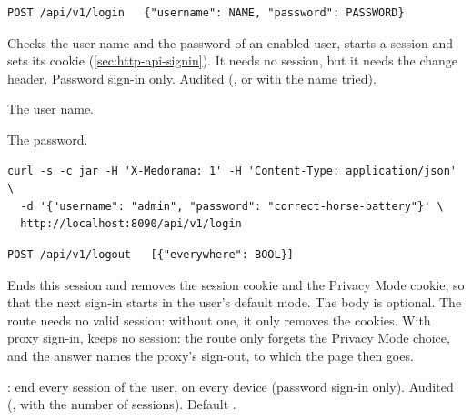 \begin{lstlisting}[style=signature]
POST /api/v1/login   {"username": NAME, "password": PASSWORD}
\end{lstlisting}
Checks the user name and the password of an enabled user, starts a session and sets its cookie
(\cref{sec:http-api-signin}). It needs no session, but it needs the change header. Password
sign-in only. Audited (, or  with the name tried).
\begin{params}
\item[username] The user name.
\item[password] The password.
\end{params}
\begin{lstlisting}[style=shell]
curl -s -c jar -H 'X-Medorama: 1' -H 'Content-Type: application/json' \
  -d '{"username": "admin", "password": "correct-horse-battery"}' \
  http://localhost:8090/api/v1/login
\end{lstlisting}

\begin{lstlisting}[style=signature]
POST /api/v1/logout   [{"everywhere": BOOL}]
\end{lstlisting}
Ends this session and removes the session cookie and the Privacy Mode cookie, so that the next
sign-in starts in the user's default mode. The body is optional. The route needs no valid
session: without one, it only removes the cookies. With proxy sign-in, \md{} keeps no session:
the route only forgets the Privacy Mode choice, and the answer names the proxy's sign-out, to
which the page then goes.
\begin{params}
\item[everywhere] : end every session of the user, on every device (password sign-in
  only). Audited (, with the number of sessions). Default
  \code{false}.
\end{params}

